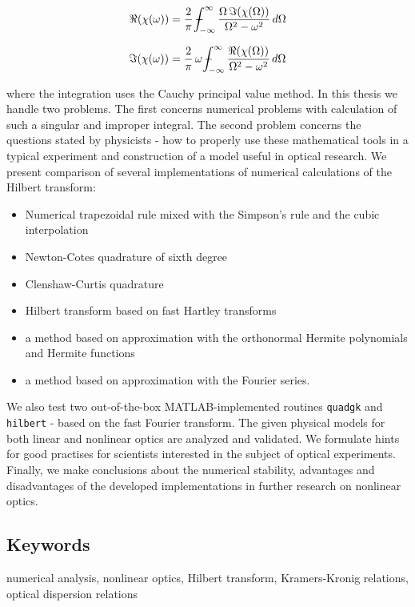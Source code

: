 \documentclass[12pt,twoside,a4paper]{article}
\def\emptyline{\vspace{12pt}}
\numberwithin{equation}{subsection}
\numberwithin{figure}{subsection}
\def\Xint#1{\mathchoice
{\XXint\displaystyle\textstyle{#1}}%
{\XXint\textstyle\scriptstyle{#1}}%
{\XXint\scriptstyle\scriptscriptstyle{#1}}%
{\XXint\scriptscriptstyle\scriptscriptstyle{#1}}%
\!\int}
\def\XXint#1#2#3{{\setbox0=\hbox{$#1{#2#3}{\int}$ }\vcenter{\hbox{$#2#3$ }}\kern-.6\wd0}}
\def\dashint{\Xint-}
\begin{document}
\begin{equation*}
  \Re (\chi (\omega ))=\frac {2}{\pi}\,\dashint_{ - \infty }^{\infty } \frac {\Omega \,\Im (\chi (\Omega ))}{\Omega ^{2} - \omega
  ^{2}} \,d\Omega 
\end{equation*}

\begin{equation*}
  \Im (\chi (\omega ))=\frac {2}{\pi}\,\omega \,\dashint_{ - \infty }^{\infty }\frac {\Re (\chi (\Omega ))}{\Omega ^{2} - \omega
  ^{2}}\, d\Omega 
\end{equation*}

where the integration uses the Cauchy principal value method. In this thesis we handle two problems. The first concerns numerical
problems with calculation of such a singular and improper integral. The second problem concerns the questions stated by physicists
- how to properly use these mathematical tools in a typical experiment and construction of a model useful in optical research. We
present comparison of several implementations of numerical calculations of the Hilbert transform:

\begin{itemize} \label{used_methods}
 \item Numerical trapezoidal rule mixed with the Simpson's rule and the
cubic interpolation
 \item Newton-Cotes quadrature of sixth degree
 \item Clenshaw-Curtis quadrature
 \item Hilbert transform based on fast Hartley transforms
 \item a method based on approximation with the orthonormal Hermite polynomials and Hermite functions
 \item a method based on approximation with the Fourier series.
\end{itemize}
We also test two out-of-the-box MATLAB-implemented routines \texttt{quadgk} and \texttt{hil\-bert} - based on the fast Fourier
transform. The given physical models for both linear and nonlinear optics are analyzed and validated. We formulate hints for good
practises for scientists interested in the subject of optical experiments. Finally, we make conclusions about the numerical stability, advantages
and disadvantages of the developed implementations in further research on nonlinear optics.

\emptyline

\subsection*{Keywords} \label{chap:abstract_keywords}
numerical analysis, nonlinear optics, Hilbert transform, Kramers-Kronig relations, optical dispersion relations
\end{document}
